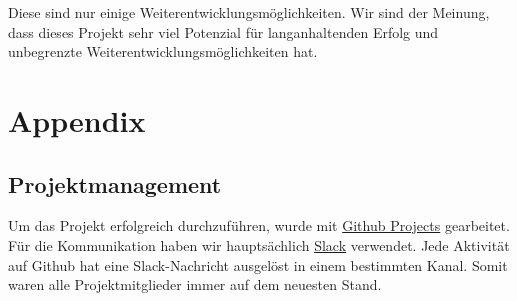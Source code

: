 \documentclass[11pt,ngerman]{article}
\begin{document}
	Diese sind nur einige Weiterentwicklungsmöglichkeiten. Wir sind der Meinung, dass dieses Projekt sehr viel Potenzial für langanhaltenden Erfolg und unbegrenzte Weiterentwicklungsmöglichkeiten hat.

    \section{Appendix}

    \subsection{Projektmanagement}
    Um das Projekt erfolgreich durchzuführen, wurde mit \hyperlink{https://github.com/features/project-management/}{Github Projects} gearbeitet. Für die Kommunikation haben wir hauptsächlich \hyperlink{https://slack.com/}{Slack} verwendet. Jede Aktivität auf Github hat eine Slack-Nachricht ausgelöst in einem bestimmten Kanal. Somit waren alle Projektmitglieder immer auf dem neuesten Stand.
\end{document}
